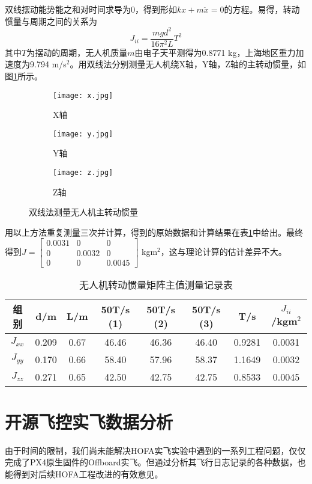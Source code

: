   双线摆动能势能之和对时间求导为$0$，得到形如$kx+m\ddot x=0$的方程。易得，转动惯量与周期之间的关系为
  $$
  J_{ii}=\frac{mgd^2}{16 \pi^2 L} T^2
  $$
其中$T$为摆动的周期，无人机质量$m$由电子天平测得为0.8771 kg，上海地区重力加速度为9.794 m/s${}^2$。用双线法分别测量无人机绕X轴，Y轴，Z轴的主转动惯量，如图\ref{双线法}所示。
  \begin{figure}[H]
    \centering
    \begin{subfigure}[c]{0.33\textwidth}
      \centering
      \texttt{[image: x.jpg]}  %
      \caption{X轴}
    \end{subfigure}\hfill
    \begin{subfigure}[c]{0.33\textwidth}
      \centering
      \texttt{[image: y.jpg]}  %
      \caption{Y轴}
    \end{subfigure}\hfill
    \begin{subfigure}[c]{0.33\textwidth}
      \centering
      \texttt{[image: z.jpg]}  %
      \caption{Z轴}
    \end{subfigure}
    \caption{双线法测量无人机主转动惯量}
    \label{双线法}
\end{figure}
用以上方法重复测量三次并计算，得到的原始数据和计算结果在表\ref{三次}中给出。最终得到$J=\begin{bmatrix}
  0.0031 &0&0\\
  0&0.0032&0\\
  0&0& 0.0045
\end{bmatrix}$ kgm${}^2$，这与理论计算的估计差异不大。
  \begin{table}[H]
    \centering
    \caption{无人机转动惯量矩阵主值测量记录表}
    \label{三次}
    \begin{tabular}{cccccccc}
        \toprule
        组别&d/m  & L/m & 50T/s (1) & 50T/s (2) &50T/s (3) & T/s & $J_{ii}$/kgm${}^2$\\
        \midrule
        $J_{xx}$ & 0.209 &0.67 & 46.46 & 46.36 & 46.40 &0.9281 &0.0031\\
        $J_{yy}$ & 0.170 &0.66 & 58.40 & 57.96 & 58.37 &1.1649 &0.0032\\
        $J_{zz}$ & 0.271 & 0.65& 42.50 & 42.75 & 42.75 &0.8533 &0.0045\\
        \bottomrule
    \end{tabular}
\end{table}

\section{开源飞控实飞数据分析}
由于时间的限制，我们尚未能解决HOFA实飞实验中遇到的一系列工程问题，仅仅完成了PX4原生固件的Offboard实飞。但通过分析其飞行日志记录的各种数据，也能得到对后续HOFA工程改进的有效意见。

